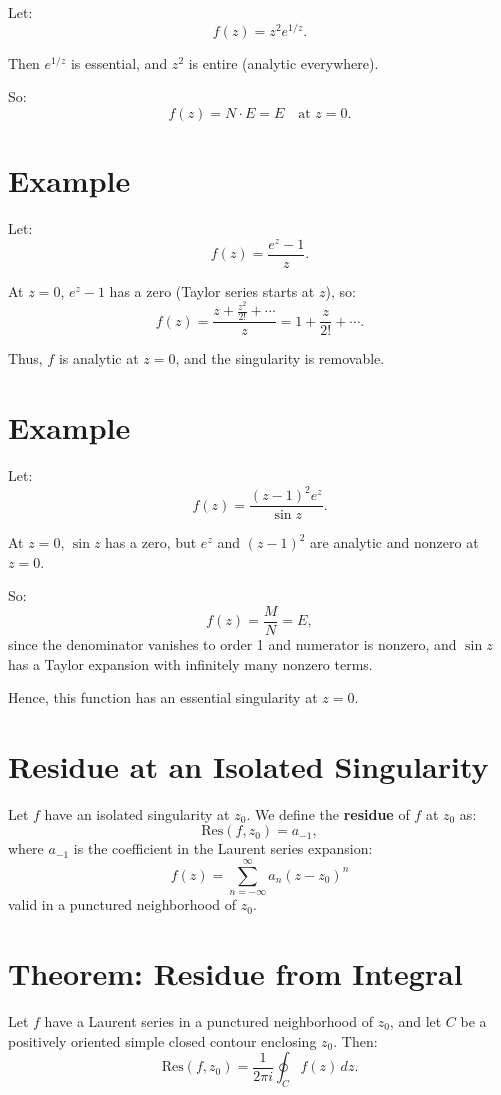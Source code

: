 \documentclass[12pt]{article}
\theoremstyle{definition} %
\theoremstyle{plain} %
\begin{document}
Let:
\[
f(z) = z^2 e^{1/z}.
\]

Then $e^{1/z}$ is essential, and $z^2$ is entire (analytic everywhere).

So:
\[
f(z) = N \cdot E = E \quad \text{at } z = 0.
\]

\section*{Example}

Let:
\[
f(z) = \frac{e^z - 1}{z}.
\]

At $z = 0$, $e^z - 1$ has a zero (Taylor series starts at $z$), so:
\[
f(z) = \frac{z + \frac{z^2}{2!} + \cdots}{z} = 1 + \frac{z}{2!} + \cdots.
\]

Thus, $f$ is analytic at $z = 0$, and the singularity is removable.

\section*{Example}

Let:
\[
f(z) = \frac{(z - 1)^2 e^z}{\sin z}.
\]

At $z = 0$, $\sin z$ has a zero, but $e^z$ and $(z - 1)^2$ are analytic and nonzero at $z = 0$.

So:
\[
f(z) = \frac{M}{N} = E,
\]
since the denominator vanishes to order 1 and numerator is nonzero, and $\sin z$ has a Taylor expansion with infinitely many nonzero terms.

Hence, this function has an essential singularity at $z = 0$.
\section*{Residue at an Isolated Singularity}

Let $f$ have an isolated singularity at $z_0$. We define the \textbf{residue} of $f$ at $z_0$ as:
\[
\text{Res}(f, z_0) = a_{-1},
\]
where $a_{-1}$ is the coefficient in the Laurent series expansion:
\[
f(z) = \sum_{n=-\infty}^\infty a_n (z - z_0)^n
\]
valid in a punctured neighborhood of $z_0$.

\section*{Theorem: Residue from Integral}

Let $f$ have a Laurent series in a punctured neighborhood of $z_0$, and let $C$ be a positively oriented simple closed contour enclosing $z_0$. Then:
\[
\text{Res}(f, z_0) = \frac{1}{2\pi i} \oint_C f(z) \, dz.
\]
\end{document}
